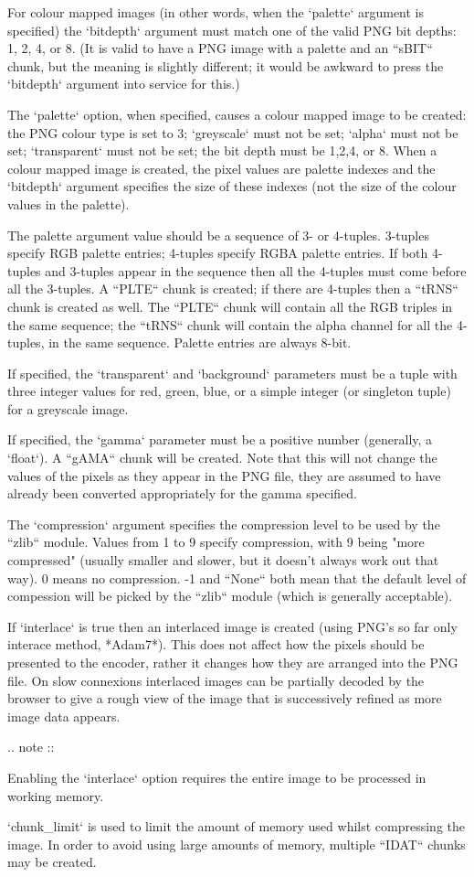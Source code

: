 \begin{DoxyVerb}
For colour mapped images (in other words, when the `palette`
argument is specified) the `bitdepth` argument must match one of
the valid PNG bit depths: 1, 2, 4, or 8.  (It is valid to have a
PNG image with a palette and an ``sBIT`` chunk, but the meaning
is slightly different; it would be awkward to press the
`bitdepth` argument into service for this.)

The `palette` option, when specified, causes a colour
mapped image to be created: the PNG colour type is set to 3;
`greyscale` must not be set; `alpha` must not be set;
`transparent` must not be set; the bit depth must be 1,2,4,
or 8.  When a colour mapped image is created, the pixel values
are palette indexes and the `bitdepth` argument specifies the
size of these indexes (not the size of the colour values in
the palette).

The palette argument value should be a sequence of 3- or
4-tuples.  3-tuples specify RGB palette entries; 4-tuples
specify RGBA palette entries.  If both 4-tuples and 3-tuples
appear in the sequence then all the 4-tuples must come
before all the 3-tuples.  A ``PLTE`` chunk is created; if there
are 4-tuples then a ``tRNS`` chunk is created as well.  The
``PLTE`` chunk will contain all the RGB triples in the same
sequence; the ``tRNS`` chunk will contain the alpha channel for
all the 4-tuples, in the same sequence.  Palette entries
are always 8-bit.

If specified, the `transparent` and `background` parameters must
be a tuple with three integer values for red, green, blue, or
a simple integer (or singleton tuple) for a greyscale image.

If specified, the `gamma` parameter must be a positive number
(generally, a `float`).  A ``gAMA`` chunk will be created.
Note that this will not change the values of the pixels as
they appear in the PNG file, they are assumed to have already
been converted appropriately for the gamma specified.

The `compression` argument specifies the compression level to
be used by the ``zlib`` module.  Values from 1 to 9 specify
compression, with 9 being "more compressed" (usually smaller
and slower, but it doesn't always work out that way).  0 means
no compression.  -1 and ``None`` both mean that the default
level of compession will be picked by the ``zlib`` module
(which is generally acceptable).

If `interlace` is true then an interlaced image is created
(using PNG's so far only interace method, *Adam7*).  This does
not affect how the pixels should be presented to the encoder,
rather it changes how they are arranged into the PNG file.
On slow connexions interlaced images can be partially decoded
by the browser to give a rough view of the image that is
successively refined as more image data appears.

.. note ::

  Enabling the `interlace` option requires the entire image
  to be processed in working memory.

`chunk_limit` is used to limit the amount of memory used whilst
compressing the image.  In order to avoid using large amounts of
memory, multiple ``IDAT`` chunks may be created.
\end{DoxyVerb}
 

